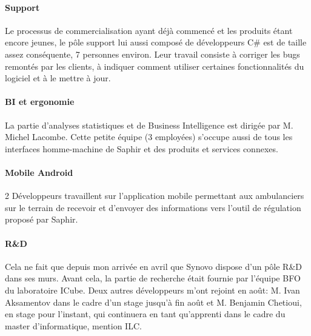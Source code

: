 \documentclass[12pt]{memoir}
\begin{document}
\paragraph{Support}\label{support}

Le processus de commercialisation ayant déjà commencé et les produits
étant encore jeunes, le pôle support lui aussi composé de développeurs
C\# est de taille assez conséquente, 7 personnes environ. Leur travail
consiste à corriger les bugs remontés par les clients, à indiquer
comment utiliser certaines fonctionnalités du logiciel et à le mettre à
jour.

\paragraph{BI et ergonomie}\label{bi-et-ergonomie}

La partie d'analyses statistiques et de Business Intelligence est
dirigée par M. Michel Lacombe. Cette petite équipe (3 employées)
s'occupe aussi de tous les interfaces homme-machine de Saphir et des
produits et services connexes.

\paragraph{Mobile Android}\label{mobile-android}

2 Développeurs travaillent sur l'application mobile permettant aux
ambulanciers sur le terrain de recevoir et d'envoyer des informations
vers l'outil de régulation proposé par Saphir.

\paragraph{R\&D}\label{rd}

Cela ne fait que depuis mon arrivée en avril que Synovo dispose d'un
pôle R\&D dans ses murs. Avant cela, la partie de recherche était
fournie par l'équipe BFO du laboratoire ICube. Deux autres développeurs
m'ont rejoint en août: M. Ivan Aksamentov dans le cadre d'un stage
jusqu'à fin août et M. Benjamin Chetioui, en stage pour l'instant, qui
continuera en tant qu'apprenti dans le cadre du master d'informatique,
mention ILC.


\label{sub:Synovo}
\end{document}
